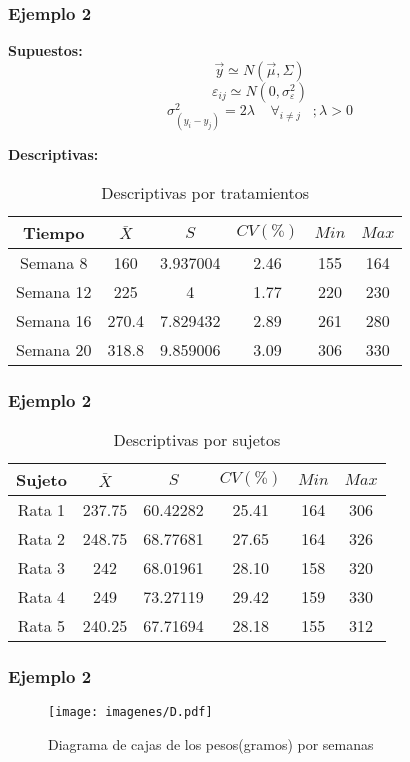 \documentclass[12pt]{beamer}
\begin{document}
\begin{frame}
\frametitle{Ejemplo 2}
\textbf{Supuestos:} 
$$\vec{y} \simeq N(\vec{\mu},\Sigma)$$
$$\varepsilon_{ij} \simeq N(0,\sigma^2_\varepsilon)$$
$$\sigma^2_{(y_i-y_j)}=2\lambda  \;\;\;\; \forall_{i\neq j} \;\;\; ; \lambda>0$$ 

\textbf{Descriptivas:}
\begin{table}[htbp]
  \centering
\resizebox{12cm}{!} {
\begin{tabular}{|c|c|c|c|c|c|}
\hline 
\textbf{Tiempo} & \textbf{$\bar{X}$} & \textbf{$S$} & \textbf{$CV(\%)$} & \textbf{$Min$} & \textbf{$Max$}\\ 
\hline 
Semana 8 & 160 &3.937004& 2.46& 155 & 164\\
Semana 12 & 225 &4& 1.77& 220 & 230\\
Semana 16 & 270.4 &7.829432& 2.89& 261 & 280\\
Semana 20 & 318.8 &9.859006& 3.09& 306 & 330 \\
\hline 
\end{tabular} 
}
\caption{Descriptivas por tratamientos}
\label{tab:addlabel}%
\end{table}%
\end{frame}

\begin{frame}
\frametitle{Ejemplo 2}
\begin{table}[htbp]
  \centering
\resizebox{12cm}{!} {
\begin{tabular}{|c|c|c|c|c|c|}
\hline 
\textbf{Sujeto} & \textbf{$\bar{X}$} & \textbf{$S$} & \textbf{$CV(\%)$} & \textbf{$Min$} & \textbf{$Max$}\\ 
\hline 
Rata 1 & 237.75 &60.42282 & 25.41& 164 & 306\\
Rata 2 & 248.75 &68.77681 & 27.65& 164 & 326\\
Rata 3 & 242    &68.01961 & 28.10& 158 & 320\\
Rata 4 & 249    &73.27119 & 29.42& 159 & 330 \\
Rata 5 & 240.25 &67.71694 & 28.18& 155 & 312 \\
\hline 
\end{tabular} 
}
\caption{Descriptivas por sujetos}
\label{tab:addlabel}%
\end{table}%
\end{frame}

\begin{frame}
\frametitle{Ejemplo 2}
\begin{figure}[h!]
\caption{Diagrama de cajas de los pesos(gramos) por semanas}
  \centering
  \texttt{[image: imagenes/D.pdf]}
\end{figure}
\end{frame}
\end{document}
